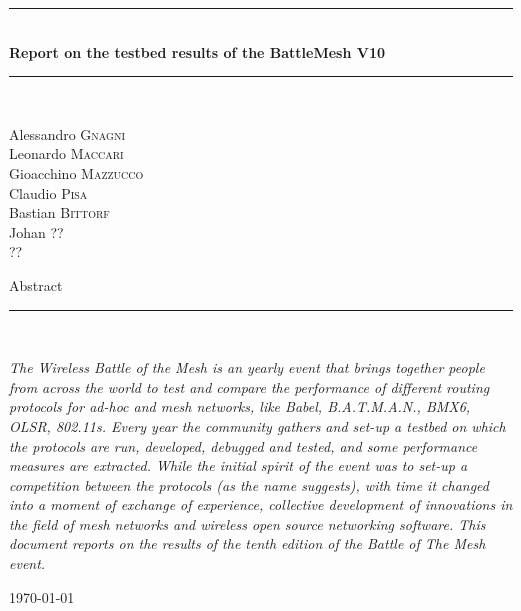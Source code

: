\documentclass[10pt,onecolumn]{paper}
\newcommand{\HRule}{\rule{\linewidth}{0.5mm}}
\begin{document}
\begin{titlepage}
\begin{center}

\HRule \\[0.4cm]
{ \huge \bfseries Report on the testbed results of the BattleMesh V10 \\[0.4cm] }

\HRule \\[1.5cm]

\begin{minipage}{0.4\textwidth}
\begin{flushleft} \large
Alessandro \textsc{Gnagni}\\
Leonardo \textsc{Maccari}\\
Gioacchino \textsc{Mazzucco}\\
Claudio \textsc{Pisa}\\
Bastian \textsc{Bittorf}\\
Johan \textsc{??}\\
 \textsc{??}\\
\end{flushleft}
\end{minipage}
\begin{minipage}{0.4\textwidth}
\end{minipage}

\vfill
{\large Abstract}
\HRule \\[0.4cm]
\begin{flushleft}
\emph{The Wireless Battle of the Mesh is an yearly event that brings together
people from across the world to test and compare the performance of different routing
protocols for ad-hoc and mesh networks, like Babel, B.A.T.M.A.N., BMX6, OLSR,
802.11s. Every year the community gathers and set-up a testbed on which the
protocols are run, developed, debugged and tested, and some performance
measures are extracted. While the initial spirit of the event was to set-up a
competition between the protocols (as the name suggests), with time it changed
into a moment of exchange of experience, collective development of
innovations in the field of mesh networks and wireless open source
networking software. This document reports on the results of the tenth edition
of the Battle of The Mesh event.}
\end{flushleft}
\vskip2cm

\vfill

{\large \today}

\end{center}
\end{titlepage}
\end{document}
